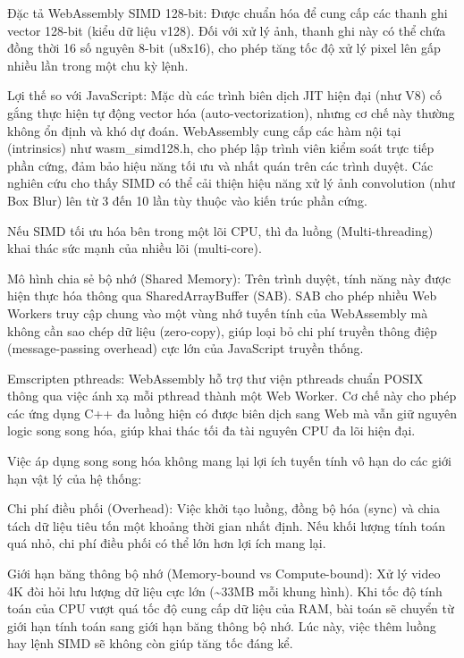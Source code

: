 Đặc tả WebAssembly SIMD 128-bit: Được chuẩn hóa để cung cấp các thanh ghi vector 128-bit (kiểu dữ liệu v128). Đối với xử lý ảnh, thanh ghi này có thể chứa đồng thời 16 số nguyên 8-bit (u8x16), cho phép tăng tốc độ xử lý pixel lên gấp nhiều lần trong một chu kỳ lệnh.


Lợi thế so với JavaScript: Mặc dù các trình biên dịch JIT hiện đại (như V8) cố gắng thực hiện tự động vector hóa (auto-vectorization), nhưng cơ chế này thường không ổn định và khó dự đoán. WebAssembly cung cấp các hàm nội tại (intrinsics) như wasm\_simd128.h, cho phép lập trình viên kiểm soát trực tiếp phần cứng, đảm bảo hiệu năng tối ưu và nhất quán trên các trình duyệt. Các nghiên cứu cho thấy SIMD có thể cải thiện hiệu năng xử lý ảnh convolution (như Box Blur) lên từ 3 đến 10 lần tùy thuộc vào kiến trúc phần cứng.



Nếu SIMD tối ưu hóa bên trong một lõi CPU, thì đa luồng (Multi-threading) khai thác sức mạnh của nhiều lõi (multi-core).


Mô hình chia sẻ bộ nhớ (Shared Memory): Trên trình duyệt, tính năng này được hiện thực hóa thông qua SharedArrayBuffer (SAB). SAB cho phép nhiều Web Workers truy cập chung vào một vùng nhớ tuyến tính của WebAssembly mà không cần sao chép dữ liệu (zero-copy), giúp loại bỏ chi phí truyền thông điệp (message-passing overhead) cực lớn của JavaScript truyền thống.


Emscripten pthreads: WebAssembly hỗ trợ thư viện pthreads chuẩn POSIX thông qua việc ánh xạ mỗi pthread thành một Web Worker. Cơ chế này cho phép các ứng dụng C++ đa luồng hiện có được biên dịch sang Web mà vẫn giữ nguyên logic song song hóa, giúp khai thác tối đa tài nguyên CPU đa lõi hiện đại.



Việc áp dụng song song hóa không mang lại lợi ích tuyến tính vô hạn do các giới hạn vật lý của hệ thống:


Chi phí điều phối (Overhead): Việc khởi tạo luồng, đồng bộ hóa (sync) và chia tách dữ liệu tiêu tốn một khoảng thời gian nhất định. Nếu khối lượng tính toán quá nhỏ, chi phí điều phối có thể lớn hơn lợi ích mang lại.


Giới hạn băng thông bộ nhớ (Memory-bound vs Compute-bound): Xử lý video 4K đòi hỏi lưu lượng dữ liệu cực lớn (\textasciitilde{}33MB mỗi khung hình). Khi tốc độ tính toán của CPU vượt quá tốc độ cung cấp dữ liệu của RAM, bài toán sẽ chuyển từ giới hạn tính toán sang giới hạn băng thông bộ nhớ. Lúc này, việc thêm luồng hay lệnh SIMD sẽ không còn giúp tăng tốc đáng kể.


